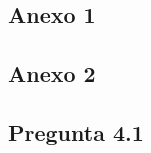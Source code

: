 \subsection{Anexo 1}
\label{sec:anexo1}
\begin{small}
	
\end{small}

\subsection{Anexo 2}
\label{sec:anexo2}
\begin{small}
	
\end{small}

\subsection{Pregunta 4.1}
\label{sec:anexo2}
\begin{small}
	
\end{small}
